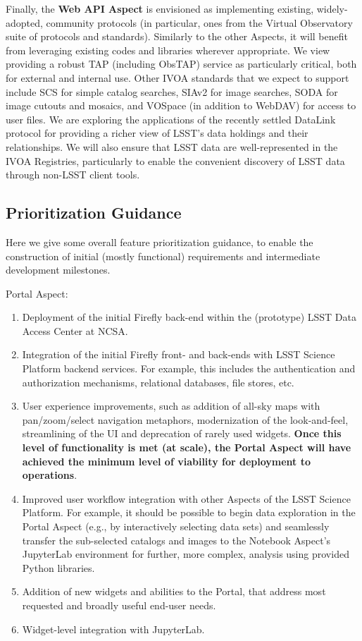 Finally, the \textbf{Web API Aspect} is envisioned as implementing existing, widely-adopted, community protocols (in particular, ones from the Virtual Observatory suite of protocols and standards).
Similarly to the other Aspects, it will benefit from leveraging existing codes and libraries wherever appropriate.
We view providing a robust TAP (including ObsTAP) service as particularly critical, both for external and internal use.
Other IVOA standards that we expect to support include SCS for simple catalog searches, SIAv2 for image searches, SODA for image cutouts and mosaics, and VOSpace (in addition to WebDAV) for access to user files.
We are exploring the applications of the recently settled DataLink protocol for providing a richer view of LSST's data holdings and their relationships.
We will also ensure that LSST data are well-represented in the IVOA Registries, particularly to enable the convenient discovery of LSST data through non-LSST client tools.

\subsection{Prioritization Guidance}

Here we give some overall feature prioritization guidance, to enable the construction of initial (mostly functional) requirements and intermediate development milestones.

Portal Aspect:
\begin{enumerate}
	\item Deployment of the initial Firefly back-end within the (prototype) LSST Data Access Center at NCSA.
	\item Integration of the initial Firefly front- and back-ends with LSST Science Platform backend services. For example, this includes the authentication and authorization mechanisms, relational databases, file stores, etc.
	\item User experience improvements, such as addition of all-sky maps with pan/zoom/select navigation metaphors, modernization of the look-and-feel, streamlining of the UI and deprecation of rarely used widgets. \textbf{Once this level of functionality is met (at scale), the Portal Aspect will have achieved the minimum level of viability for deployment to operations}.
	\item Improved user workflow integration with other Aspects of the LSST Science Platform. For example, it should be possible to begin data exploration in the Portal Aspect (e.g., by interactively selecting data sets) and seamlessly transfer the sub-selected catalogs and images to the Notebook Aspect's JupyterLab environment for further, more complex, analysis using provided Python libraries.
	\item Addition of new widgets and abilities to the Portal, that address most requested and broadly useful end-user needs.
	\item Widget-level integration with JupyterLab.
\end{enumerate}

